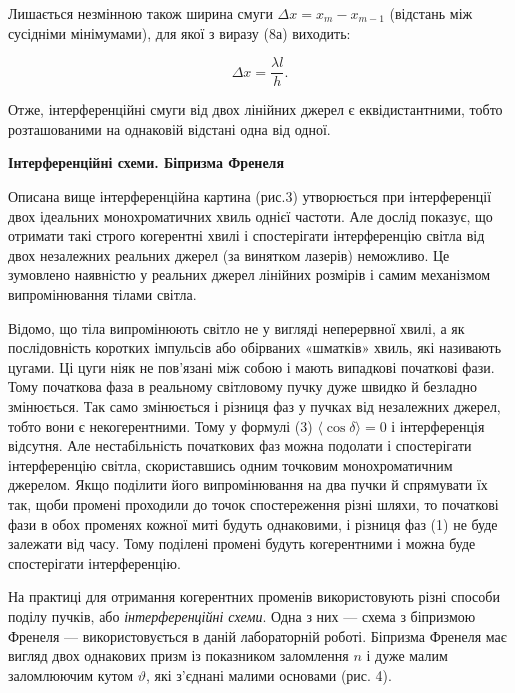 \documentclass[12pt,a4paper]{article}
\begin{document}
    Лишається незмінною також ширина смуги $\Delta x = x_m - x_{m-1}$ (відстань між сусідніми мінімумами), для якої з виразу (8а) виходить:

    \begin{equation}
        \Delta x = \frac{\lambda l}{h}.
        \tag{9}
    \end{equation}

    Отже, інтерференційні смуги від двох лінійних джерел є еквідистантними,
    тобто розташованими на однаковій відстані одна від одної.

    \vspace{1em}

    \begin{center} \textbf{Інтерференційні схеми. Біпризма Френеля} \end{center}

    Описана вище інтерференційна картина (рис.3) утворюється при інтерференції двох ідеальних монохроматичних хвиль однієї частоти.
    Але дослід показує, що отримати такі строго когерентні хвилі і спостерігати інтерференцію світла від двох незалежних реальних
    джерел (за винятком лазерів) неможливо. Це зумовлено наявністю у реальних джерел лінійних розмірів і самим механізмом випромінювання
    тілами світла.

    Відомо, що тіла випромінюють світло не у вигляді неперервної хвилі, а
    як послідовність коротких імпульсів або обірваних «шматків» хвиль, які називають цугами.
    Ці цуги ніяк не пов’язані між собою і мають випадкові початкові фази.
    Тому початкова фаза в реальному світловому пучку дуже швидко
    й безладно змінюється. Так само змінюється і різниця фаз у пучках від незалежних джерел, тобто вони є некогерентними.
    Тому у формулі (3) $\langle \cos \delta \rangle = 0$
    і інтерференція відсутня. Але нестабільність початкових фаз можна подолати
    і спостерігати інтерференцію світла, скориставшись одним точковим монохроматичним джерелом.
    Якщо поділити його випромінювання на два пучки й спрямувати їх так, щоби промені проходили до точок спостереження різні
    шляхи, то початкові фази в обох променях кожної миті будуть однаковими, і
    різниця фаз (1) не буде залежати від часу.
    Тому поділені промені будуть когерентними і можна буде спостерігати інтерференцію.

    На практиці для отримання когерентних променів використовують різні способи поділу пучків, або
    \textit{інтерференційні схеми}.
    Одна з них --- схема з біпризмою Френеля --- використовується в даній лабораторній роботі.
    Біпризма Френеля має вигляд двох однакових призм із показником заломлення $n$
    і дуже малим заломлюючим кутом $\vartheta$, які з'єднані малими основами (рис. 4).
\end{document}
